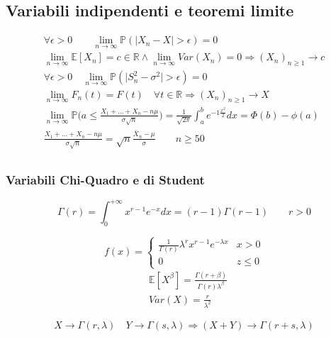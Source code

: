 \subsection{Variabili indipendenti e teoremi limite}
\begin{align}
	\forall \epsilon > 0 \quad\quad \lim_{n \to \infty} \mathbb{P}(\lvert X_n - X \rvert > \epsilon) = 0 \tag{Convergenza in probabilità}\\
	\lim_{n \to \infty} \mathbb{E}[X_n] = c \in \mathbb{R} \land \lim_{n \to \infty} Var(X_n)=0 \Longrightarrow (X_n)_{n\geq 1} \longrightarrow c \tag{Convergenza in probabilità ad una costante}\\
	\forall \epsilon > 0 \quad \lim_{n \to \infty} \mathbb{P}(\lvert S_n^2 - \sigma^2 \rvert > \epsilon) = 0\\
	\lim_{n \to \infty} F_n(t)=F(t) \quad \forall t \in \mathbb{R} \Longrightarrow (X_n)_{n \geq 1} \longrightarrow X \tag{Convergenza in distribuzione}\\
	\lim_{n \to \infty}\mathbb{P}\bigg(a \leq \frac{X_1 + \ldots + X_n - n\mu}{\sigma \sqrt{n}}\bigg) = \frac{1}{\sqrt{2\pi}}\int_{a}^{b}e^{-1\frac{x^2}{2}}dx = \Phi(b)-\phi(a) \tag{Teorema centrale del limite}\\
	\frac{X_1 + \ldots + X_n -n\mu}{\sigma \sqrt{n}} = \sqrt{n}\frac{\bar{X}_n-\mu}{\sigma} \quad\quad n\geq 50\tag{Approssimazione a variabile Gaussiana} \\
\end{align}

\subsubsection{Variabili Chi-Quadro e di Student}
\begin{definition}
	\begin{equation}
		\Gamma(r)=\int_{0}^{+\infty} x^{r-1}e^{-x}dx = (r-1)\Gamma(r-1) \quad\quad r>0
	\end{equation}
\end{definition}
\begin{definition}
	\begin{equation}
		f(x) = \begin{cases}
			\frac{1}{\Gamma(r)} \lambda^rx^{r-1}e^{-\lambda x} & x >0\\
			0& z \leq 0
		\end{cases}
	\end{equation}
	\begin{align}
		& \mathbb{E}[X^\beta] = \frac{\Gamma(r+\beta)}{\Gamma(r)\lambda^\beta} \\
		& Var(X)=\frac{r}{\lambda^2}
	\end{align}
\end{definition}
\begin{proposition}
	\begin{equation}
		X\to \Gamma(r, \lambda) \quad Y \to \Gamma(s, \lambda) \Longrightarrow (X+Y) \to \Gamma(r+s, \lambda)
	\end{equation}
\end{proposition}

